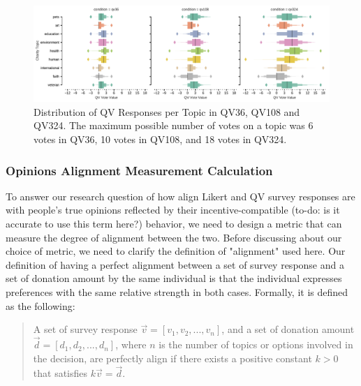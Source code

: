 \begin{figure}[htpb]
    \centering
    \includegraphics[width=\textwidth, keepaspectratio=true]{content/image/qv_distribution_per_topic.pdf}
    \caption{
      Distribution of QV Responses per Topic in QV36, QV108 and QV324. The maximum possible number of votes on a topic was 6 votes in QV36, 10 votes in QV108, and 18 votes in QV324.
    }
    \label{fig:qv3_exp1}
\end{figure}


\subsubsection{Opinions Alignment Measurement Calculation}

To answer our research question of how align Likert and QV survey responses are with people's true opinions reflected by their incentive-compatible (to-do: is it accurate to use this term here?) behavior, we need to design a metric that can measure the degree of alignment between the two. Before discussing about our choice of metric, we need to clarify the definition of "alignment" used here. Our definition of having a perfect alignment between a set of survey response and a set of donation amount by the same individual is that the individual expresses preferences with the same relative strength in both cases. Formally, it is defined as the following:\par

\begin{quote}
    A set of survey response $\vec{v} = [v_1, v_2, ..., v_n]$, and a set of donation amount $\vec{d} = [d_1, d_2, ..., d_n]$, where $n$ is the number of topics or options involved in the decision, are perfectly align if there exists a positive constant $k>0$ that satisfies $k\vec{v} = \vec{d}$.
\end{quote}


